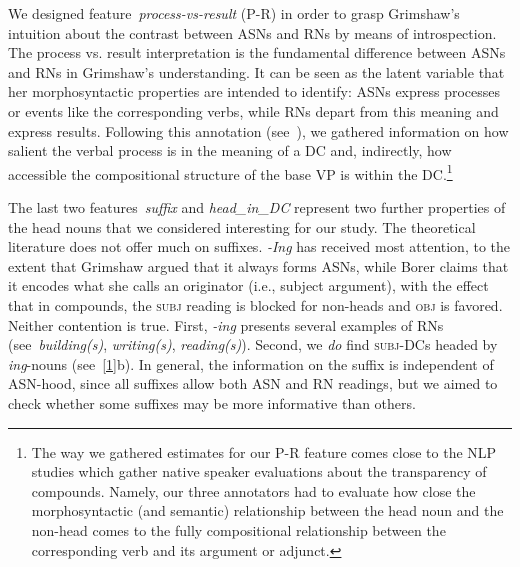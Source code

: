 \documentclass[output=paper]{langsci/langscibook}
\begin{document}
We designed feature~\textit{process-vs-result} (P-R) in order to grasp Grimshaw's intuition about the contrast between ASNs and RNs by means of introspection. The process vs. result interpretation is  the fundamental difference between ASNs and RNs in Grimshaw's understanding.   It can be seen as the latent variable that her morphosyntactic properties are intended to identify: ASNs express processes or events like the corresponding verbs, while RNs depart from this meaning and express results. Following this annotation (see~), we gathered information on how salient the verbal process is in the meaning of a DC and, indirectly, how accessible the compositional structure of the base VP is within the DC.\footnote{The way we gathered estimates for our P-R feature comes close to the NLP studies which gather native speaker evaluations about the transparency of compounds. Namely, our three annotators had to evaluate how close the morphosyntactic (and semantic) relationship between the head noun and the non-head comes to the fully compositional relationship between the corresponding verb and its argument or adjunct.}


The last two features~\textit{suffix} and \textit{head\_in\_DC} represent two further properties of the head nouns that we considered interesting for our study. The theoretical literature does not offer much on suffixes. \textit{-Ing} has received most attention, to the extent that Grimshaw argued that it always forms ASNs, while Borer claims that it encodes  {what she calls an} originator (i.e., subject argument), with the effect that in compounds, the \textsc{subj} reading is blocked for non-heads and \textsc{obj} is favored. Neither contention is true. First, \textit{-ing} presents several examples of RNs (see~\textit{building(s)}, \textit{writing(s)}, \textit{reading(s)}). Second, we \textit{do} find \textsc{subj}-DCs headed by \textit{ing}-nouns (see~\ref{1}b). In general, the information on the suffix is independent of ASN-hood, since all suffixes allow both ASN and RN readings, but we aimed to check whether some suffixes may be more informative than others. 
\end{document}
